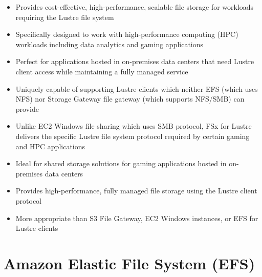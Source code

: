 \documentclass[11pt,a4paper]{report}
\begin{document}
\begin{itemize}
\begin{itemize}
  \item Provides cost-effective, high-performance, scalable file storage for workloads requiring the Lustre file system
  \item Specifically designed to work with high-performance computing (HPC) workloads including data analytics and gaming applications
  \item Perfect for applications hosted in on-premises data centers that need Lustre client access while maintaining a fully managed service
  \item Uniquely capable of supporting Lustre clients which neither EFS (which uses NFS) nor Storage Gateway file gateway (which supports NFS/SMB) can provide
  \item Unlike EC2 Windows file sharing which uses SMB protocol, FSx for Lustre delivers the specific Lustre file system protocol required by certain gaming and HPC applications
  \item Ideal for shared storage solutions for gaming applications hosted in on-premises data centers
  \item Provides high-performance, fully managed file storage using the Lustre client protocol
  \item More appropriate than S3 File Gateway, EC2 Windows instances, or EFS for Lustre clients
\end{itemize}
\end{itemize}


\section{Amazon Elastic File System (EFS)}
\end{document}
